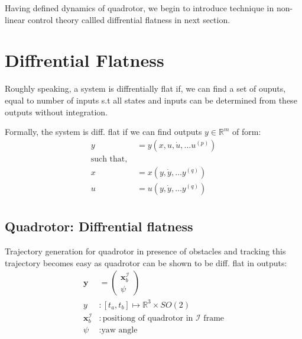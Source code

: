 Having defined dynamics of quadrotor, we begin to introduce technique in non-linear control theory callled diffrential flatness in next section.

\section{Diffrential Flatness}
Roughly speaking, a  system is diffrentially flat if, we can find a set of ouputs, equal to number of inputs s.t all states and inputs can be determined from these outputs without integration\cite{murray1995differential}.

Formally, the system is diff. flat if we can find outputs $y \in \mathbb{R}^m$ of form:
\begin{align*}
    y &= y(x, u, \dot{u}, \dots u^{(p)}) \\
\text{such that, }\\
x &= x(y, \dot{y}, \dots y^{(q)}) \\
u &= u(y, \dot{y}, \dots y^{(q)}) \\
\end{align*}

\subsection{Quadrotor: Diffrential flatness}
Trajectory generation for quadrotor in presence of obstacles and tracking this trajectory becomes easy as quadrotor can be shown to be diff. flat \cite{mellinger2011minimum} in outputs:
\begin{align*}
    \mathbf{y} &= \begin{pmatrix} \mathbf{x}^\mathcal{I}_b \\ \psi \end{pmatrix}\\
    y &:[t_a, t_b] \mapsto \mathbb{R}^3 \times SO(2)\\
    \mathbf{x}^\mathcal{I}_b &: \text{positiong of quadrotor in $\mathcal{I}$ frame}\\
    \psi &: \text{yaw angle}
\end{align*}
